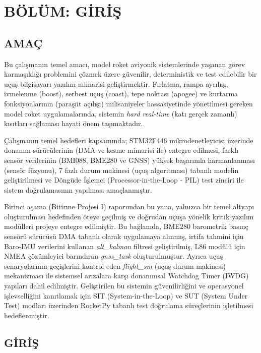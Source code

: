 \clearpage

\section{BÖLÜM: GİRİŞ}
\label{bolum1}

\subsection{AMAÇ}
\label{amac}

Bu çalışmanın temel amacı, model roket aviyonik sistemlerinde yaşanan görev karmaşıklığı problemini çözmek üzere güvenilir, deterministik ve test edilebilir bir uçuş bilgisayarı yazılım mimarisi geliştirmektir. Fırlatma, rampa ayrılışı, ivmelenme (boost), serbest uçuş (coast), tepe noktası (apogee) ve kurtarma fonksiyonlarının (paraşüt açılışı) milisaniyeler hassasiyetinde yönetilmesi gereken model roket uygulamalarında, sistemin \textit{hard real-time} (katı gerçek zamanlı) kısıtları sağlaması hayati önem taşımaktadır. 

Çalışmanın temel hedefleri kapsamında; STM32F446 mikrodenetleyicisi üzerinde donanım sürücülerinin (DMA ve kesme mimarisi ile) entegre edilmesi, farklı sensör verilerinin (BMI088, BME280 ve GNSS) yüksek başarımla harmanlanması (sensör füzyonu), 7 fazlı durum makinesi (uçuş algoritması) tabanlı modelin geliştirilmesi ve Döngüde İşlemci (Processor-in-the-Loop - PIL) test zinciri ile sistem doğrulamasının yapılması amaçlanmıştır. 

Birinci aşama (Bitirme Projesi I) raporundan bu yana, yalnızca bir temel altyapı oluşturulması hedefinden öteye geçilmiş ve doğrudan uçuşa yönelik kritik yazılım modülleri projeye entegre edilmiştir. Bu bağlamda, BME280 barometrik basınç sensörü sürücüsü DMA tabanlı olarak uygulamaya alınmış, irtifa tahmini için Baro-IMU verilerini kullanan \textit{alt\_kalman} filtresi geliştirilmiş, L86 modülü için NMEA çözümleyici barındıran \textit{gnss\_task} oluşturulmuştur. Ayrıca uçuş senaryolarının geçişlerini kontrol eden \textit{flight\_sm} (uçuş durum makinesi) mekanizması ile sistemsel arızalara karşı donanımsal Watchdog Timer (IWDG) yapıları dahil edilmiştir. Geliştirilen bu sistemin güvenilirliğini ve operasyonel işlevselliğini kanıtlamak için SIT (System-in-the-Loop) ve SUT (System Under Test) modları üzerinden RocketPy tabanlı test doğrulama süreçlerinin işletilmesi hedeflenmiştir.

\subsection{GİRİŞ}
\label{giris}


